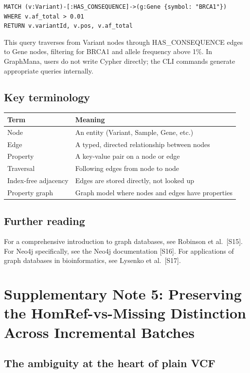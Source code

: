 \documentclass[11pt,a4paper]{article}
\begin{document}
\begin{lstlisting}
MATCH (v:Variant)-[:HAS_CONSEQUENCE]->(g:Gene {symbol: "BRCA1"})
WHERE v.af_total > 0.01
RETURN v.variantId, v.pos, v.af_total
\end{lstlisting}

This query traverses from Variant nodes through HAS\_CONSEQUENCE edges to Gene nodes, filtering for BRCA1 and allele frequency above 1\%. In GraphMana, users do not write Cypher directly; the CLI commands generate appropriate queries internally.

\subsection*{Key terminology}

\begin{tabular}{ll}
\toprule
Term & Meaning \\
\midrule
Node & An entity (Variant, Sample, Gene, etc.) \\
Edge & A typed, directed relationship between nodes \\
Property & A key-value pair on a node or edge \\
Traversal & Following edges from node to node \\
Index-free adjacency & Edges are stored directly, not looked up \\
Property graph & Graph model where nodes and edges have properties \\
\bottomrule
\end{tabular}

\subsection*{Further reading}

For a comprehensive introduction to graph databases, see Robinson et al.\ [S15]. For Neo4j specifically, see the Neo4j documentation [S16]. For applications of graph databases in bioinformatics, see Lysenko et al.\ [S17].

\newpage

\section{Supplementary Note 5: Preserving the HomRef-vs-Missing Distinction Across Incremental Batches}

\subsection*{The ambiguity at the heart of plain VCF}
\end{document}
